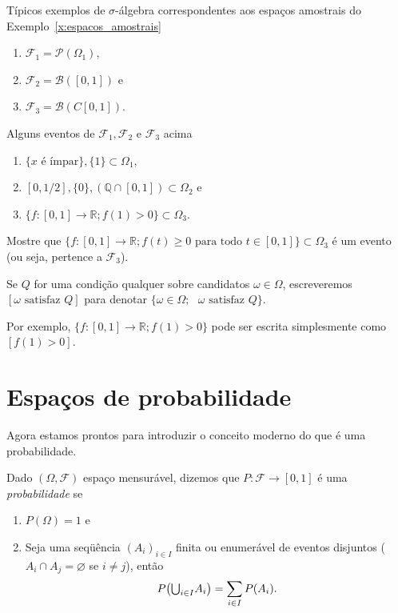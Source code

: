 \begin{example} Típicos exemplos de $\sigma$-álgebra correspondentes aos espaços amostrais do Exemplo~\ref{x:espacos_amostrais}
  \begin{enumerate}[\quad a)]
  \item $\mathcal{F}_1 = \mathcal{P}(\Omega_1)$,
  \item $\mathcal{F}_2 = \mathcal{B}([0,1])$ e
  \item $\mathcal{F}_3 = \mathcal{B}(C[0,1])$.
  \end{enumerate}
\end{example}

\begin{example} Alguns eventos de $\mathcal{F}_1, \mathcal{F}_2$ e $\mathcal{F}_3$ acima
  \begin{enumerate}[\quad a)]
  \item $\{\text{$x$ é ímpar}\}, \{1\} \subset \Omega_1$,
  \item $[0,1/2], \{0\}, (\mathbb{Q} \cap [0,1]) \subset \Omega_2$ e
  \item $\{f:[0,1] \to \mathbb{R}; f(1) > 0\} \subset \Omega_3$.
  \end{enumerate}
\end{example}

\begin{exercise}
  Mostre que $\{f:[0,1] \to \mathbb{R}; f(t) \geq 0 \text{ para todo $t \in [0,1]$}\} \subset \Omega_3$ é um evento (ou seja, pertence a $\mathcal{F}_3$).
\end{exercise}

\begin{notation}
  Se $Q$ for uma condição qualquer sobre candidatos $\omega \in \Omega$, escreveremos $[\text{$\omega$ satisfaz $Q$}]$  para denotar $\{\omega \in \Omega; \text{ $\omega$ satisfaz $Q$}\}$.
\end{notation}

Por exemplo, $\{f:[0,1] \to \mathbb{R}; f(1) > 0\}$ pode ser escrita simplesmente como $[f(1) > 0]$.

\section{Espaços de probabilidade}

Agora estamos prontos para introduzir o conceito moderno do que é uma probabilidade.

\begin{definition}
  Dado $(\Omega, \mathcal{F})$ espaço mensurável, dizemos que $P:\mathcal{F} \to [0,1]$ é uma \emph{probabilidade}  se
  \begin{enumerate}[\quad a)]
  \item $P(\Omega) = 1$ e
  \item Seja uma seqüência $(A_i)_{i\in I}$ finita ou enumerável de eventos disjuntos ($A_i \cap A_j = \varnothing$ se $i \neq j$), então
    \begin{equation}
      P\big({\operatorname*{{\textstyle \bigcup}}\nolimits_{i\in I}} A_i\big) = \sum_{i\in I} P(A_i).
    \end{equation}
  \end{enumerate}
\end{definition}

